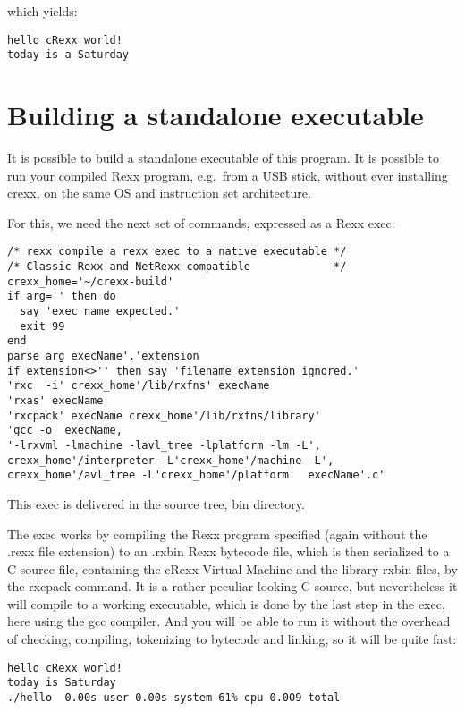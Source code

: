 which yields:

\begin{verbatim}
hello cRexx world!
today is a Saturday
\end{verbatim}

\hypertarget{building-a-standalone-executable}{%
\section{Building a standalone
executable}\label{building-a-standalone-executable}}

It is possible to build a standalone executable of this program. It is
possible to run your compiled Rexx program, e.g.~from a USB stick,
without ever installing crexx, on the same OS and instruction set
architecture.

For this, we need the next set of commands, expressed as a Rexx exec:

\begin{verbatim}
/* rexx compile a rexx exec to a native executable */
/* Classic Rexx and NetRexx compatible             */
crexx_home='~/crexx-build'
if arg='' then do
  say 'exec name expected.'
  exit 99
end
parse arg execName'.'extension
if extension<>'' then say 'filename extension ignored.'
'rxc  -i' crexx_home'/lib/rxfns' execName
'rxas' execName
'rxcpack' execName crexx_home'/lib/rxfns/library'
'gcc -o' execName,
'-lrxvml -lmachine -lavl_tree -lplatform -lm -L',
crexx_home'/interpreter -L'crexx_home'/machine -L',
crexx_home'/avl_tree -L'crexx_home'/platform'  execName'.c'
\end{verbatim}

This exec is delivered in the source tree, bin directory.

The exec works by compiling the Rexx program specified (again without
the .rexx file extension) to an .rxbin Rexx bytecode file, which is then
serialized to a C source file, containing the cRexx Virtual Machine and
the library rxbin files, by the rxcpack command. It is a rather peculiar
looking C source, but nevertheless it will compile to a working
executable, which is done by the last step in the exec, here using the
gcc compiler. And you will be able to run it without the overhead of
checking, compiling, tokenizing to bytecode and linking, so it will be
quite fast:

\begin{verbatim}
hello cRexx world!
today is Saturday
./hello  0.00s user 0.00s system 61% cpu 0.009 total
\end{verbatim}
